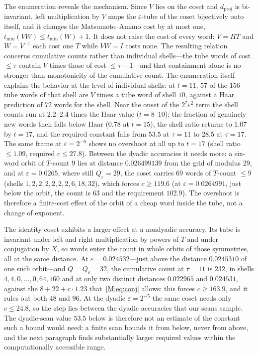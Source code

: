 \documentclass[aps,prx,twocolumn,superscriptaddress,nofootinbib,longbibliography]{revtex4-2}
\theoremstyle{plain}
\theoremstyle{definition}
\theoremstyle{remark}
\newcommand{\dproj}{d_{\mathrm{proj}}}
\begin{document}
The enumeration reveals the mechanism. Since $V$ lies on the coset and $\dproj$ is bi-invariant, left multiplication by $V$ maps the $\varepsilon$-tube of the coset bijectively onto itself, and it changes the Matsumoto--Amano cost by at most one, $t_{\min}(VW)\le t_{\min}(W)+1$. It does not raise the cost of every word: $V=HT$ and $W=V^{-1}$ each cost one $T$ while $VW=I$ costs none. The resulting relation concerns cumulative counts rather than individual shells---the tube words of cost $\le\tau$ contain $V$ times those of cost $\le\tau-1$---and that containment alone is no stronger than monotonicity of the cumulative count. The enumeration itself explains the behavior at the level of individual shells: at $t=11$, $57$ of the $156$ tube words of that shell are $V$ times a tube word of shell $10$, against a Haar prediction of $72$ words for the shell. Near the onset of the $2^\tau\varepsilon^2$ term the shell counts run at $2.2$--$2.4$ times the Haar value ($t=8$--$10$); the fraction of genuinely new words then falls below Haar ($0.78$ at $t=15$), the shell ratio returns to $1.07$ by $t=17$, and the required constant falls from $53.5$ at $\tau=11$ to $28.5$ at $\tau=17$. The same frame at $\varepsilon=2^{-6}$ shows no overshoot at all up to $t=17$ (shell ratio $\le1.09$, required $c\le27.8$). Between the dyadic accuracies it needs more: a six-word orbit of $T$-count $9$ lies at distance $0.026499139$ from the grid of modulus $29$, and at $\varepsilon=0.0265$, where still $Q_\varepsilon=29$, the coset carries $69$ words of $T$-count $\le9$ (shells $1,2,2,2,2,2,2,6,18,32$), which forces $c\ge119.6$ (at $\varepsilon=0.0264991$, just below the orbit, the count is $63$ and the requirement $102.9$). The overshoot is therefore a finite-cost effect of the orbit of a cheap word inside the tube, not a change of exponent. 

The identity coset exhibits a larger effect at a nondyadic accuracy. Its tube is invariant under left and right multiplication by powers of $T$ and under conjugation by $X$, so words enter the count in whole orbits of those symmetries, all at the same distance. At $\varepsilon=0.024532$---just above the distance $0.0245310$ of one such orbit---and $Q=Q_\varepsilon=32$, the cumulative count at $\tau=11$ is $232$, in shells $4,4,0,\dots,0,64,160$ and at only two distinct distances $0.022965$ and $0.024531$, against the $8+22+c\cdot1.23$ that~\eqref{M:eq:conj} allows: this forces $c\ge163.9$, and it rules out both $48$ and $96$. At the dyadic $\varepsilon=2^{-5}$ the same coset needs only $c\le24.8$, so the step lies between the dyadic accuracies that our scans sample. The dyadic-scan value $53.5$ below is therefore not an estimate of the constant such a bound would need: a finite scan bounds it from below, never from above, and the next paragraph finds substantially larger required values within the computationally accessible range. 
\end{document}
